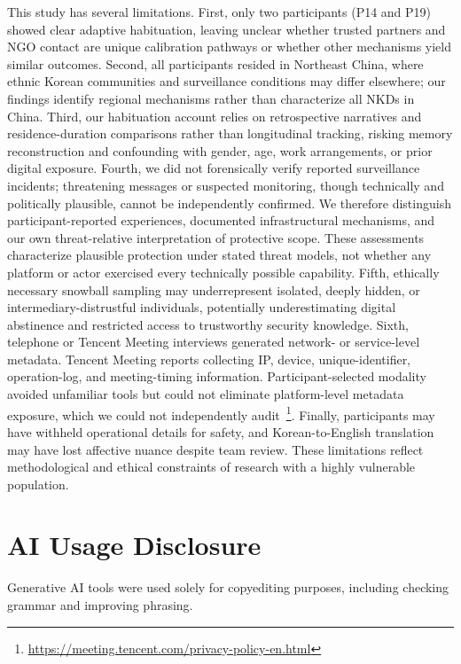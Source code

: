 \documentclass[conference,compsoc]{IEEEtran}
\begin{document}
This study has several limitations. First, only two participants (P14 and P19) showed clear adaptive habituation, leaving unclear whether trusted partners and NGO contact are unique calibration pathways or whether other mechanisms yield similar outcomes. Second, all participants resided in Northeast China, where ethnic Korean communities and surveillance conditions may differ elsewhere; our findings identify regional mechanisms rather than characterize all NKDs in China. Third, our habituation account relies on retrospective narratives and residence-duration comparisons rather than longitudinal tracking, risking memory reconstruction and confounding with gender, age, work arrangements, or prior digital exposure. Fourth, we did not forensically verify reported surveillance incidents; threatening messages or suspected monitoring, though technically and politically plausible, cannot be independently confirmed. We therefore distinguish participant-reported experiences, documented infrastructural mechanisms, and our own threat-relative interpretation of protective scope. These assessments characterize plausible protection under stated threat models, not whether any platform or actor exercised every technically possible capability. Fifth, ethically necessary snowball sampling may underrepresent isolated, deeply hidden, or intermediary-distrustful individuals, potentially underestimating digital abstinence and restricted access to trustworthy security knowledge. Sixth, telephone or Tencent Meeting interviews generated network- or service-level metadata. Tencent Meeting reports collecting IP, device, unique-identifier, operation-log, and meeting-timing information. Participant-selected modality avoided unfamiliar tools but could not eliminate platform-level metadata exposure, which we could not independently audit~\footnote{\url{https://meeting.tencent.com/privacy-policy-en.html}}. Finally, participants may have withheld operational details for safety, and Korean-to-English translation may have lost affective nuance despite team review. These limitations reflect methodological and ethical constraints of research with a highly vulnerable population.



\section{AI Usage Disclosure}
Generative AI tools were used solely for copyediting purposes, including checking grammar and improving phrasing. 
\end{document}
